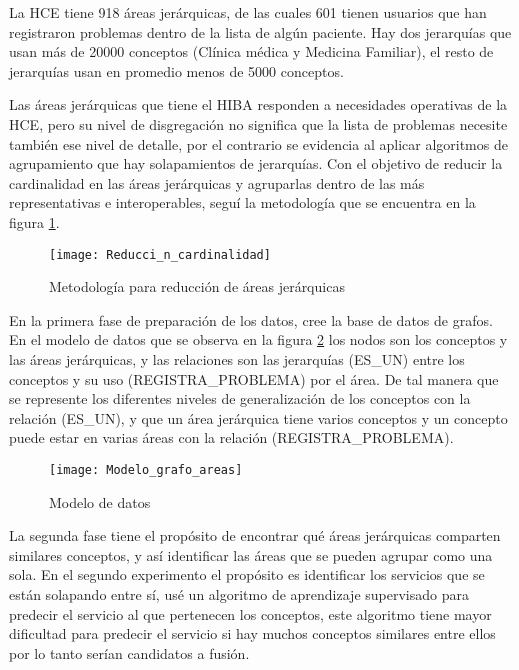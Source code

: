 La HCE tiene 918 áreas jerárquicas, de las cuales 601 tienen usuarios que han registraron problemas dentro de la lista de algún paciente. Hay dos jerarquías que usan más de \num{20000} conceptos (Clínica médica y Medicina Familiar), el resto de jerarquías usan en promedio menos de 5000 conceptos. 

Las áreas jerárquicas que tiene el HIBA responden a necesidades operativas de la HCE, pero su nivel de disgregación no significa que la lista de problemas necesite también ese nivel de detalle, por el contrario se evidencia al aplicar algoritmos de agrupamiento que hay solapamientos de jerarquías. Con el objetivo de reducir la cardinalidad en las áreas jerárquicas y agruparlas dentro de las más representativas e interoperables, seguí la metodología que se encuentra en la figura \ref{fig:MetodologiaReduccionAreas}.


\begin{figure}[ht]
\caption{Metodología para reducción de áreas jerárquicas}
\label{fig:MetodologiaReduccionAreas}
\centering
\texttt{[image: Reducci\_n\_cardinalidad]}
\end{figure}

En la primera fase de preparación de los datos, cree la base de datos de grafos. En el modelo de datos que se observa en la figura \ref{fig:ModeloDatosAreas} los nodos son los conceptos y las áreas jerárquicas, y las relaciones son las jerarquías (ES\_UN) entre los conceptos y su uso (REGISTRA\_PROBLEMA)  por el área. De tal manera que se represente los diferentes niveles de generalización de los conceptos con la relación (ES\_UN), y que un área jerárquica tiene varios conceptos y un concepto puede estar en varias áreas con la relación (REGISTRA\_PROBLEMA). 

\begin{figure}[ht]
\caption{Modelo de datos}
\label{fig:ModeloDatosAreas}
\centering
\texttt{[image: Modelo\_grafo\_areas]}
\end{figure}

La segunda fase tiene el propósito de encontrar qué áreas jerárquicas comparten similares conceptos, y así identificar las áreas que se pueden agrupar como una sola. En el segundo experimento el propósito es identificar los servicios que se están solapando entre sí, usé un algoritmo de aprendizaje supervisado para predecir el servicio al que pertenecen los conceptos, este algoritmo tiene mayor dificultad para predecir el servicio si hay muchos conceptos similares entre ellos por lo tanto serían candidatos a fusión.

